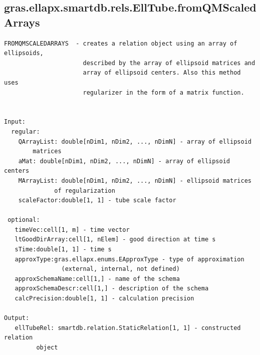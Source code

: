 \documentclass[letterpaper,10pt,english]{sphinxmanual}
\begin{document}
\subsection{gras.ellapx.smartdb.rels.EllTube.fromQMScaledArrays}
\label{chap_functions:gras-ellapx-smartdb-rels-elltube-fromqmscaledarrays}
\begin{Verbatim}[commandchars=\\\{\}]
FROMQMSCALEDARRAYS  - creates a relation object using an array of ellipsoids,
                      described by the array of ellipsoid matrices and
                      array of ellipsoid centers. Also this method uses
                      regularizer in the form of a matrix function.


Input:
  regular:
    QArrayList: double[nDim1, nDim2, ..., nDimN] - array of ellipsoid
        matrices
    aMat: double[nDim1, nDim2, ..., nDimN] - array of ellipsoid centers
    MArrayList: double[nDim1, nDim2, ..., nDimN] - ellipsoid matrices
              of regularization
    scaleFactor:double[1, 1] - tube scale factor

 optional:
   timeVec:cell[1, m] - time vector
   ltGoodDirArray:cell[1, nElem] - good direction at time s
   sTime:double[1, 1] - time s
   approxType:gras.ellapx.enums.EApproxType - type of approximation
                (external, internal, not defined)
   approxSchemaName:cell[1,] - name of the schema
   approxSchemaDescr:cell[1,] - description of the schema
   calcPrecision:double[1, 1] - calculation precision

Output:
   ellTubeRel: smartdb.relation.StaticRelation[1, 1] - constructed relation
         object
\end{Verbatim}
\end{document}
